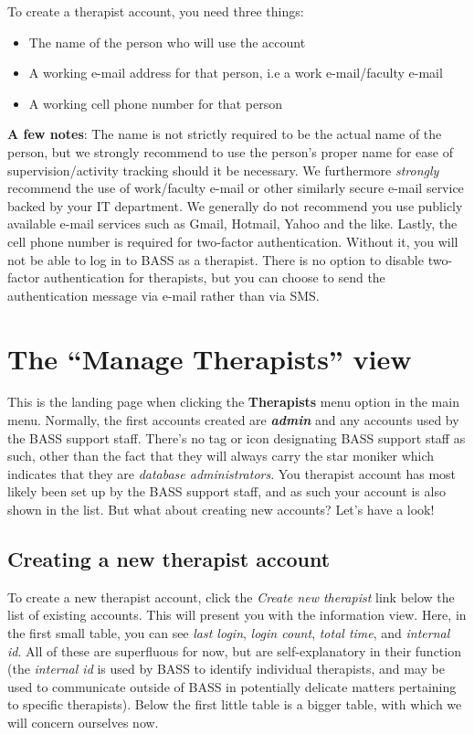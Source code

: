 \documentclass[
]{book}
\providecommand{\tightlist}{%
  \setlength{\itemsep}{0pt}\setlength{\parskip}{0pt}}
\begin{document}
To create a therapist account, you need three things:

\begin{itemize}
\tightlist
\item
  The name of the person who will use the account
\item
  A working e-mail address for that person, i.e a work e-mail/faculty e-mail
\item
  A working cell phone number for that person
\end{itemize}

\textbf{A few notes}: The name is not strictly required to be the actual name of the person, but we strongly recommend to use the person's proper name for ease of supervision/activity tracking should it be necessary.
We furthermore \emph{strongly} recommend the use of work/faculty e-mail or other similarly secure e-mail service backed by your IT department. We generally do not recommend you use publicly available e-mail services such as Gmail, Hotmail, Yahoo and the like.
Lastly, the cell phone number is required for two-factor authentication. Without it, you will not be able to log in to BASS as a therapist. There is no option to disable two-factor authentication for therapists, but you can choose to send the authentication message via e-mail rather than via SMS.

\section{The ``Manage Therapists'' view}\label{the-manage-therapists-view}

This is the landing page when clicking the \textbf{Therapists} menu option in the main menu. Normally, the first accounts created are \textbf{\emph{admin}} and any accounts used by the BASS support staff. There's no tag or icon designating BASS support staff as such, other than the fact that they will always carry the star moniker which indicates that they are \emph{database administrators}.
You therapist account has most likely been set up by the BASS support staff, and as such your account is also shown in the list. But what about creating new accounts? Let's have a look!

\subsection{Creating a new therapist account}\label{creating-a-new-therapist-account}

To create a new therapist account, click the \emph{Create new therapist} link below the list of existing accounts. This will present you with the information view. Here, in the first small table, you can see \emph{last login}, \emph{login count}, \emph{total time}, and \emph{internal id}. All of these are superfluous for now, but are self-explanatory in their function (the \emph{internal id} is used by BASS to identify individual therapists, and may be used to communicate outside of BASS in potentially delicate matters pertaining to specific therapists).
Below the first little table is a bigger table, with which we will concern ourselves now.
\end{document}
